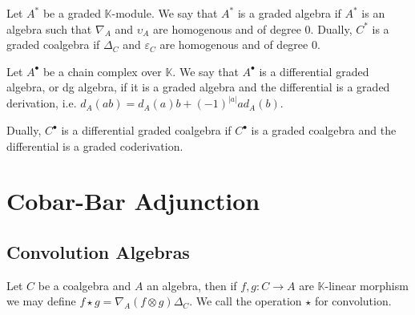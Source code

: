 \documentclass[../thesis.tex]{subfiles}
\begin{document}
            \begin{definition}
                Let $A^*$ be a graded $\mathbb{K}$-module. We say that $A^*$ is a graded algebra if $A^*$ is an algebra such that $\nabla_A$ and $\upsilon_A$ are homogenous and of degree $0$.
                Dually, $C^*$ is a graded coalgebra if $\Delta_C$ and $\varepsilon_C$ are homogenous and of degree $0$.
            \end{definition}

            \begin{definition}
                Let $A^{\bullet}$ be a chain complex over $\mathbb{K}$. We say that $A^{\bullet}$ is a differential graded algebra, or dg algebra, if it is a graded algebra and the differential is a graded derivation, i.e. $d_A(ab) = d_A(a)b + (-1)^{|a|}ad_A(b)$.

                Dually, $C^{\bullet}$ is a differential graded coalgebra if $C^{\bullet}$ is a graded coalgebra and the differential is a graded coderivation.
            \end{definition}
    \section{Cobar-Bar Adjunction}
    \subsection{Convolution Algebras}

            Let $C$ be a coalgebra and $A$ an algebra, then if $f,g:C\rightarrow A$ are $\mathbb{K}$-linear morphism we may define $f\star g = \nabla_A(f\otimes g)\Delta_C$. We call the operation $\star$ for convolution.

            \begin{center}
            \end{center}
\end{document}
